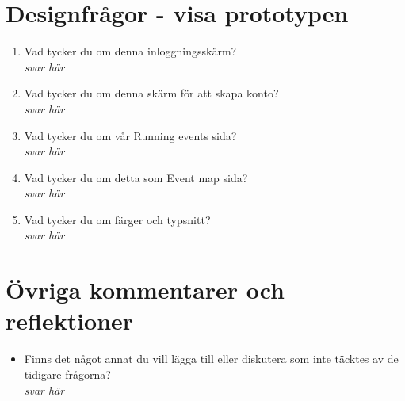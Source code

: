 \documentclass{article}
\begin{document}
\section*{Designfrågor - visa prototypen}
\begin{enumerate}[label=\textbf{Fråga \arabic*:}]
    \item Vad tycker du om denna inloggningsskärm?\\
        \textit{svar här}
    \item Vad tycker du om denna skärm för att skapa konto?\\
        \textit{svar här}
    \item Vad tycker du om vår Running events sida?\\
        \textit{svar här}
    \item Vad tycker du om detta som Event map sida?\\
        \textit{svar här}
    \item Vad tycker du om färger och typsnitt?\\
        \textit{svar här}
\end{enumerate}

\section*{Övriga kommentarer och reflektioner}
\begin{itemize}[label=]
    \item Finns det något annat du vill lägga till eller diskutera som inte täcktes av de tidigare frågorna?\\
    \textit{svar här}
\end{itemize}
\thispagestyle{empty}
\end{document}
